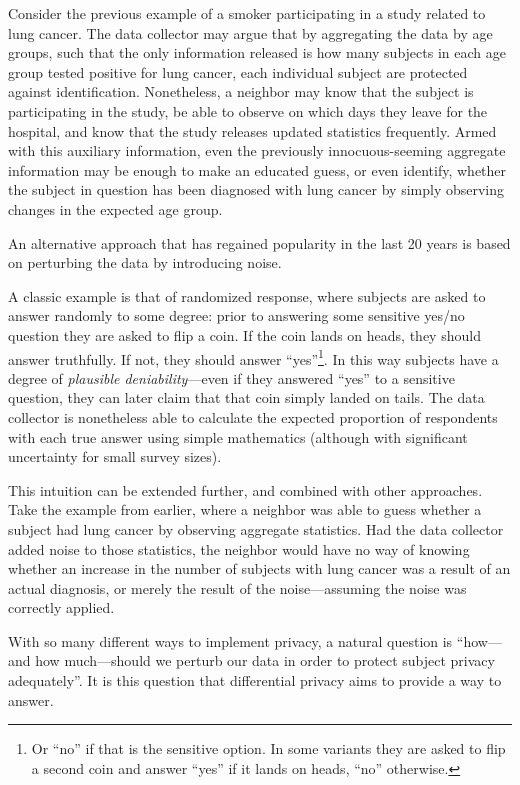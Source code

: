 \documentclass[12pt]{article}
\begin{document}
Consider the previous example of a smoker participating in a study related to lung cancer. The data collector may argue that by aggregating the data by age groups, such that the only information released is how many subjects in each age group tested positive for lung cancer, each individual subject are protected against identification. Nonetheless, a neighbor may know that the subject is participating in the study, be able to observe on which days they leave for the hospital, and know that the study releases updated statistics frequently. Armed with this auxiliary information, even the previously innocuous-seeming aggregate information may be enough to make an educated guess, or even identify, whether the subject in question has been diagnosed with lung cancer by simply observing changes in the expected age group. \bigskip

An alternative approach that has regained popularity in the last 20 years is based on perturbing the data by introducing noise.

A classic example is that of randomized response, where subjects are asked to answer randomly to some degree: prior to answering some sensitive yes/no question they are asked to flip a coin. If the coin lands on heads, they should answer truthfully. If not, they should answer ``yes''\footnote{Or ``no'' if that is the sensitive option. In some variants they are asked to flip a second coin and answer ``yes'' if it lands on heads, ``no'' otherwise.}. In this way subjects have a degree of \emph{plausible deniability}---even if they answered ``yes'' to a sensitive question, they can later claim that that coin simply landed on tails. The data collector is nonetheless able to calculate the expected proportion of respondents with each true answer using simple mathematics (although with significant uncertainty for small survey sizes).

This intuition can be extended further, and combined with other approaches. Take the example from earlier, where a neighbor was able to guess whether a subject had lung cancer by observing aggregate statistics. Had the data collector added noise to those statistics, the neighbor would have no way of knowing whether an increase in the number of subjects with lung cancer was a result of an actual diagnosis, or merely the result of the noise---assuming the noise was correctly applied. \bigskip

With so many different ways to implement privacy, a natural question is ``how---and how much---should we perturb our data in order to protect subject privacy adequately''. It is this question that differential privacy aims to provide a way to answer.
\end{document}
